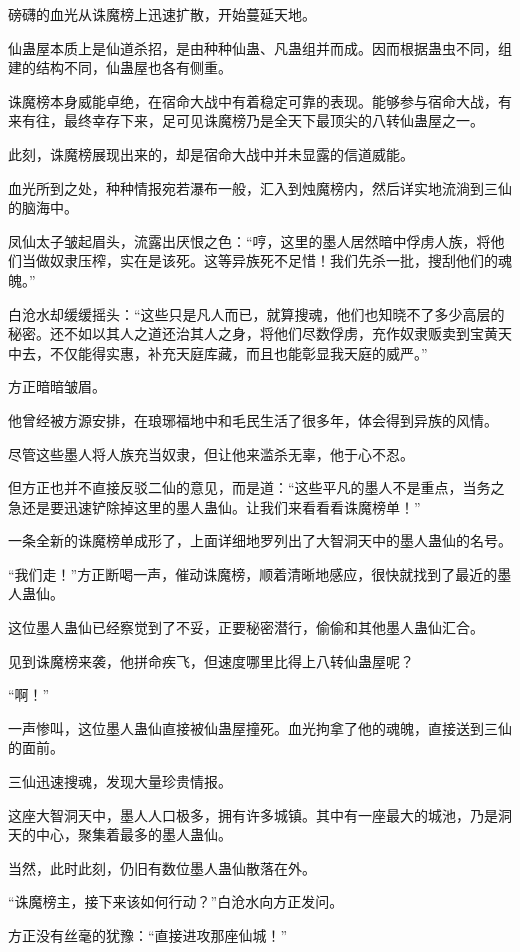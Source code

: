 \begin{this_body}
磅礴的血光从诛魔榜上迅速扩散，开始蔓延天地。

仙蛊屋本质上是仙道杀招，是由种种仙蛊、凡蛊组并而成。因而根据蛊虫不同，组建的结构不同，仙蛊屋也各有侧重。

诛魔榜本身威能卓绝，在宿命大战中有着稳定可靠的表现。能够参与宿命大战，有来有往，最终幸存下来，足可见诛魔榜乃是全天下最顶尖的八转仙蛊屋之一。

此刻，诛魔榜展现出来的，却是宿命大战中并未显露的信道威能。

血光所到之处，种种情报宛若瀑布一般，汇入到烛魔榜内，然后详实地流淌到三仙的脑海中。

凤仙太子皱起眉头，流露出厌恨之色：“哼，这里的墨人居然暗中俘虏人族，将他们当做奴隶压榨，实在是该死。这等异族死不足惜！我们先杀一批，搜刮他们的魂魄。”

白沧水却缓缓摇头：“这些只是凡人而已，就算搜魂，他们也知晓不了多少高层的秘密。还不如以其人之道还治其人之身，将他们尽数俘虏，充作奴隶贩卖到宝黄天中去，不仅能得实惠，补充天庭库藏，而且也能彰显我天庭的威严。”

方正暗暗皱眉。

他曾经被方源安排，在琅琊福地中和毛民生活了很多年，体会得到异族的风情。

尽管这些墨人将人族充当奴隶，但让他来滥杀无辜，他于心不忍。

但方正也并不直接反驳二仙的意见，而是道：“这些平凡的墨人不是重点，当务之急还是要迅速铲除掉这里的墨人蛊仙。让我们来看看看诛魔榜单！”

一条全新的诛魔榜单成形了，上面详细地罗列出了大智洞天中的墨人蛊仙的名号。

“我们走！”方正断喝一声，催动诛魔榜，顺着清晰地感应，很快就找到了最近的墨人蛊仙。

这位墨人蛊仙已经察觉到了不妥，正要秘密潜行，偷偷和其他墨人蛊仙汇合。

见到诛魔榜来袭，他拼命疾飞，但速度哪里比得上八转仙蛊屋呢？

“啊！”

一声惨叫，这位墨人蛊仙直接被仙蛊屋撞死。血光拘拿了他的魂魄，直接送到三仙的面前。

三仙迅速搜魂，发现大量珍贵情报。

这座大智洞天中，墨人人口极多，拥有许多城镇。其中有一座最大的城池，乃是洞天的中心，聚集着最多的墨人蛊仙。

当然，此时此刻，仍旧有数位墨人蛊仙散落在外。

“诛魔榜主，接下来该如何行动？”白沧水向方正发问。

方正没有丝毫的犹豫：“直接进攻那座仙城！”


\end{this_body}
